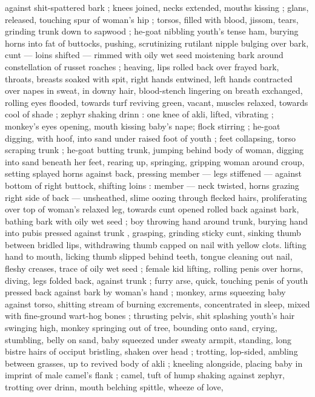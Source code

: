 against shit-spattered bark ; knees joined, necks extended, mouths 
kissing ; glans, released, touching spur of woman's hip ; torsos, filled 
with blood, jissom, tears, grinding trunk down to sapwood ; he-goat 
nibbling youth's tense ham, burying horns into fat of buttocks, 
pushing, scrutinizing rutilant nipple bulging over bark, cunt --- loins 
shifted --- rimmed with oily wet seed moistening bark around 
constellation of russet roaches ; heaving, lips rolled back over frayed 
bark, throats, breasts soaked with spit, right hands entwined, left 
hands contracted over napes in sweat, in downy hair, blood-stench 
lingering on breath exchanged, rolling eyes flooded, towards turf 
reviving green, vacant, muscles relaxed, towards cool of shade ; 
zephyr shaking drinn : one knee of akli, lifted, vibrating ; monkey's 
eyes opening, mouth kissing baby's nape; flock stirring ; he-goat 
digging, with hoof, into sand under raised foot of youth ; feet 
collapsing, torso scraping trunk ; he-goat butting trunk, jumping 
behind body of woman, digging into sand beneath her feet, rearing 
up, springing, gripping woman around croup, setting splayed horns 
against back, pressing member --- legs stiffened --- against bottom 
of right buttock, shifting loins : member --- neck twisted, horns 
grazing right side of back --- unsheathed, slime oozing through 
flecked hairs, proliferating over top of woman's relaxed leg, towards 
cunt opened rolled back against bark, bathing bark with oily wet seed 
; boy throwing hand around trunk, burying hand into pubis pressed 
against trunk , grasping, grinding sticky cunt, sinking thumb between 
bridled lips, withdrawing thumb capped on nail with yellow clots. 
lifting hand to mouth, licking thumb slipped behind teeth, tongue 
cleaning out nail, fleshy creases, trace of oily wet seed ; female kid 
lifting, rolling penis over horns, diving, legs folded back, against 
trunk ; furry arse, quick, touching penis of youth pressed back 
against bark by woman's hand ; monkey, arms squeezing baby 
against torso, shitting stream of burning excrements, concentrated 
in sleep, mixed with fine-ground wart-hog bones ; thrusting pelvis, 
shit splashing youth's hair swinging high, monkey springing out of 
tree, bounding onto sand, crying, stumbling, belly on sand, baby 
squeezed under sweaty armpit, standing, long bistre hairs of occiput 
bristling, shaken over head ; trotting, lop-sided, ambling between 
grasses, up to revived body of akli ; kneeling alongside, placing baby 
in imprint of male camel's flank ; camel, tuft of hump shaking against 
zephyr, trotting over drinn, mouth belching spittle, wheeze of love, 
